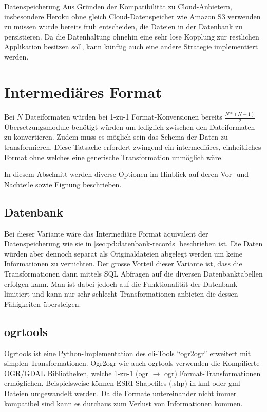 
\begin{decision}[label=dec:pd:datenspeicherung]{Datenspeicherung}
Aus Gründen der Kompatibilität zu Cloud-Anbietern, insbesondere Heroku ohne gleich Cloud-Datenspeicher wie Amazon S3 verwenden zu müssen wurde bereits früh entscheiden, die Dateien in der Datenbank zu persistieren. Da die Datenhaltung ohnehin eine sehr lose Kopplung zur restlichen Applikation besitzen soll, kann künftig auch eine andere Strategie implementiert werden.
\end{decision}


\section{Intermediäres Format}

Bei $N$ Dateiformaten würden bei 1-zu-1 Format-Konversionen bereits $\frac{N*(N-1)}2$ Übersetzungsmodule benötigt würden um lediglich zwischen den Dateiformaten zu konvertieren. Zudem muss es möglich sein das Schema der Daten zu transformieren. Diese Tatsache erfordert zwingend ein intermediäres, einheitliches Format ohne welches eine generische Transformation unmöglich wäre.

In diesem Abschnitt werden diverse Optionen im Hinblick auf deren Vor- und Nachteile sowie Eignung beschrieben. 

\subsection{Datenbank}
Bei dieser Variante wäre das Intermediäre Format äquivalent der Datenspeicherung wie sie in \cref{sec:pd:datenbank-records} beschrieben ist. Die Daten würden aber dennoch separat als Originaldateien abgelegt werden um keine Informationen zu vernichten. Der grosse Vorteil dieser Variante ist, dass die Transformationen dann mittels SQL Abfragen auf die diversen Datenbanktabellen erfolgen kann. Man ist dabei jedoch auf die Funktionalität der Datenbank limitiert und kann nur sehr schlecht Transformationen anbieten die dessen Fähigkeiten übersteigen.


\subsection{ogrtools}

Ogrtools ist eine Python-Implementation des \acs{cli}-Tools ``ogr2ogr'' erweitert mit simplen Transformationen. Ogr2ogr wie auch ogrtools verwenden die Kompilierte OGR/GDAL Bibliotheken, welche 1-zu-1 (ogr $\to$ ogr) Format-Transformationen ermöglichen. Beispielsweise können ESRI Shapefiles (.shp) in \gls{kml} oder \gls{gml} Dateien umgewandelt werden. Da die Formate untereinander nicht immer kompatibel sind kann es durchaus zum Verlust von Informationen kommen.

